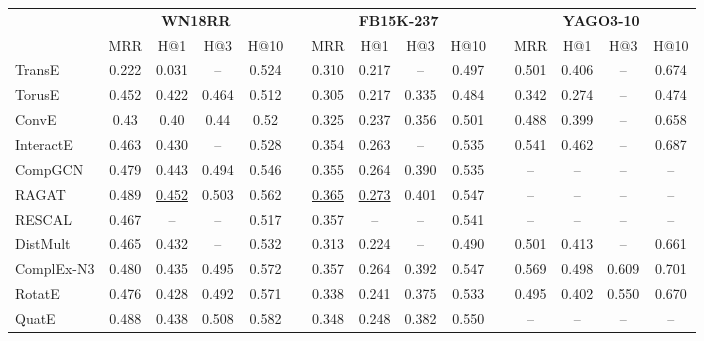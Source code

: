 \documentclass{article}
\theoremstyle{plain}
\theoremstyle{remark}
\begin{document}
\begin{table*}[ht]


	\centering  
	\begin{adjustbox}{max width=\textwidth}
		\begin{tabular}{@{\extracolsep{-4pt}}lcccclcccclcccc}


			& \multicolumn{4}{c}{\textbf{WN18RR}} && \multicolumn{4}{c}{\textbf{FB15K-237}} && \multicolumn{4}{c}{\textbf{YAGO3-10}} \\
			\cmidrule(lr){2-5} \cmidrule(lr){7-10} \cmidrule(lr){12-15}
			& MRR & H@1 & H@3 & H@10 && MRR & H@1 & H@3 & H@10 && MRR & H@1 & H@3 & H@10 \\
			
			\cmidrule(lr){1-5} \cmidrule(lr){7-10} \cmidrule(lr){12-15}
			
TransE \cite{bordes_translatingembeddingsmodeling_2013}  & 0.222 & 0.031 & -- & 0.524 && 0.310 & 0.217 & -- & 0.497 && 0.501 & 0.406 & -- & 0.674 \\
			TorusE \cite{ebisu_generalizedtranslationbasedembedding_2019}  & 0.452 & 0.422 & 0.464 & 0.512 && 0.305 & 0.217 & 0.335 & 0.484 && 0.342 & 0.274 & -- & 0.474 \\
\cmidrule(lr){1-5} \cmidrule(lr){7-10} \cmidrule(lr){12-15}
			
ConvE \cite{dettmers_convolutional2dknowledge_2018}  & 0.43 & 0.40 & 0.44 & 0.52 && 0.325 & 0.237 & 0.356 & 0.501 && 0.488 & 0.399 & -- & 0.658 \\
			InteractE \cite{vashishth_interacteimprovingconvolutionbased_2020} & 0.463 & 0.430 & -- & 0.528 && 0.354 & 0.263 & -- & 0.535 && 0.541 & 0.462 & -- & 0.687 \\
CompGCN \cite{vashishth_compositionbasedmultirelationalgraph_2020} & 0.479 & 0.443 & 0.494 & 0.546 && 0.355 & 0.264 & 0.390 & 0.535 && -- & -- & -- & -- \\
			RAGAT \cite{liu_ragatrelationaware_2021} & 0.489 & \underline{0.452} & 0.503 & 0.562 && \underline{0.365} & \underline{0.273} & 0.401 & 0.547 && -- & -- & -- & -- \\
			\cmidrule(lr){1-5} \cmidrule(lr){7-10} \cmidrule(lr){12-15}
			
RESCAL \cite{nickel_threewaymodelcollective_2011}  & 0.467 & -- & -- & 0.517 && 0.357 & -- & -- & 0.541 && -- & -- & -- & -- \\
DistMult \cite{yang_embeddingentitiesrelations_2015}  & 0.465 & 0.432 & -- & 0.532 && 0.313 & 0.224 & -- & 0.490 && 0.501 & 0.413 & -- & 0.661 \\
ComplEx-N3 \cite{trouillon_complexembeddingssimple_2016}  & 0.480 & 0.435 & 0.495 & 0.572 && 0.357 & 0.264 & 0.392 & 0.547 && 0.569 & 0.498 & 0.609 & 0.701 \\
RotatE \cite{sun_rotateknowledgegraph_2019} & 0.476 & 0.428 & 0.492 & 0.571 && 0.338 & 0.241 & 0.375 & 0.533 && 0.495 & 0.402 & 0.550 & 0.670 \\
			QuatE \cite{zhang_quaternionknowledgegraph_2019} & 0.488 & 0.438 & 0.508 & 0.582 && 0.348 & 0.248 & 0.382 & 0.550 && -- & -- & -- & -- \\
			

\end{tabular}
\end{adjustbox}
\end{table*}
\end{document}
